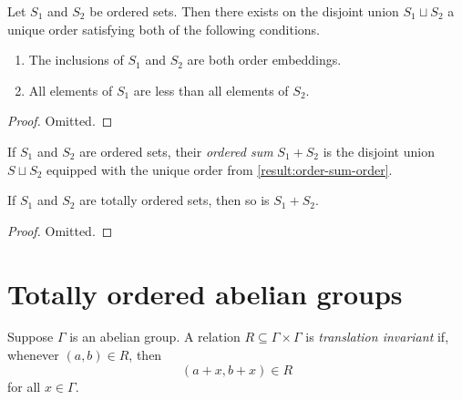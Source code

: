 \begin{lemma}
\label{result:order-sum-order}
Let $S_1$ and $S_2$ be ordered sets. Then there exists on the disjoint union $S_1 \sqcup S_2$ a unique order satisfying both of the following conditions.
\begin{enumerate}[label=(\arabic{*})]
\item The inclusions of $S_1$ and $S_2$ are both order embeddings. 
\item All elements of $S_1$ are less than all elements of $S_2$. 
\end{enumerate}
\end{lemma}

\begin{proof}
Omitted.  
\end{proof}

\begin{definition}
\label{definition:ordered-sum}
If $S_1$ and $S_2$ are ordered sets, their \emph{ordered sum} $S_1 + S_2$ is the disjoint union $S \sqcup S_2$ equipped with the unique order from \cref{result:order-sum-order}.  
\end{definition}

\begin{lemma}
If $S_1$ and $S_2$ are totally ordered sets, then so is $S_1 + S_2$. 
\end{lemma}

\begin{proof}
Omitted.
\end{proof}

\section{Totally ordered abelian groups}

\begin{definition}
\label{definition:translation-invariant-relation}

Suppose $\Gamma$ is an abelian group. A relation $R \subseteq \Gamma \times \Gamma$ is \emph{translation  invariant} if, whenever $(a,b) \in R$, then
\[ (a + x, b+x) \in R  \]
for all $x \in \Gamma$. 
\end{definition}

